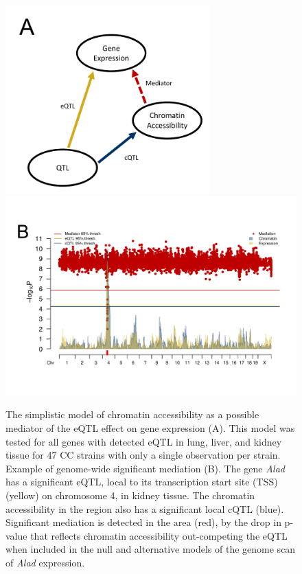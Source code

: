 \begin{figure}
\centering
\includegraphics[width=0.7\textwidth, trim={0in 0.1in 0in 0in}, clip]{figures/1-introduction/mediation_example_part1.pdf}
\includegraphics[width=\textwidth, trim={0in 0.9in 0in 0in}, clip]{figures/1-introduction/mediation_example_part2.pdf}
\caption[Mediation model and example of genome-wide significant mediation of gene expression through chromatin accessibility]{The simplistic model of chromatin accessibility as a possible mediator of the eQTL effect on gene expression (A). This model was tested for all genes with detected eQTL in lung, liver, and kidney tissue for 47 CC strains with only a single observation per strain. Example of genome-wide significant mediation (B). The gene \textit{Alad} has a significant eQTL, local to its transcription start site (TSS) (yellow) on chromosome 4, in kidney tissue. The chromatin accessibility in the region also has a significant local cQTL (blue). Significant mediation is detected in the area (red), by the drop in p-value that reflects chromatin accessibility out-competing the eQTL when included in the null and alternative models of the genome scan of \textit{Alad} expression. \label{fig:mediation_example}}
\end{figure}

